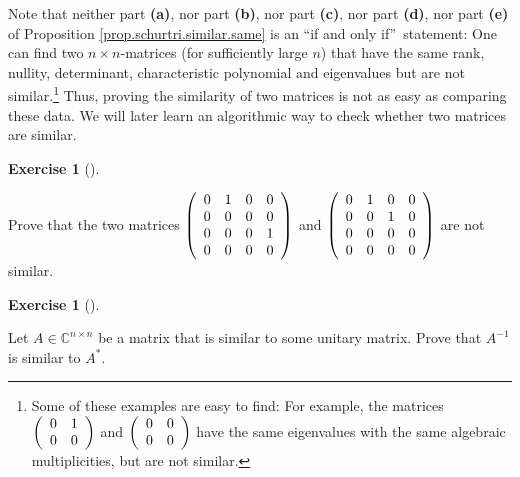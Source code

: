 \documentclass[numbers=enddot,12pt,final,onecolumn,notitlepage]{scrartcl}%
\newcounter{exer}
\numberwithin{exer}{subsection}
\theoremstyle{definition}
\newtheorem{exmp}[exer]{Exercise}
\newenvironment{exercise}[1][]
{\begin{exmp}[#1]\begin{leftbar}}
{\end{leftbar}\end{exmp}}
\begin{document}
Note that neither part \textbf{(a)}, nor part \textbf{(b)}, nor part
\textbf{(c)}, nor part \textbf{(d)}, nor part \textbf{(e)} of Proposition
\ref{prop.schurtri.similar.same} is an \textquotedblleft if and only
if\textquotedblright\ statement: One can find two $n\times n$-matrices (for
sufficiently large $n$) that have the same rank, nullity, determinant,
characteristic polynomial and eigenvalues but are not similar.\footnote{Some
of these examples are easy to find: For example, the matrices $\left(
\begin{array}
[c]{cc}%
0 & 1\\
0 & 0
\end{array}
\right)  $ and $\left(
\begin{array}
[c]{cc}%
0 & 0\\
0 & 0
\end{array}
\right)  $ have the same eigenvalues with the same algebraic multiplicities,
but are not similar.} Thus, proving the similarity of two matrices is not as
easy as comparing these data. We will later learn an algorithmic way to check
whether two matrices are similar.

\begin{exercise}
\label{exe.schurtri.similar.two-4x4s} Prove that the two matrices
$\left(
\begin{array}
[c]{cccc}%
0 & 1 & 0 & 0\\
0 & 0 & 0 & 0\\
0 & 0 & 0 & 1\\
0 & 0 & 0 & 0
\end{array}
\right)  $ and $\left(
\begin{array}
[c]{cccc}%
0 & 1 & 0 & 0\\
0 & 0 & 1 & 0\\
0 & 0 & 0 & 0\\
0 & 0 & 0 & 0
\end{array}
\right)  $ are not similar.
\end{exercise}

\begin{exercise}
\label{exe.schurtri.similar.unitary-inv} Let $A\in\mathbb{C}^{n\times
n}$ be a matrix that is similar to some unitary matrix. Prove that $A^{-1}$ is
similar to $A^{\ast}$.
\end{exercise}
\end{document}
